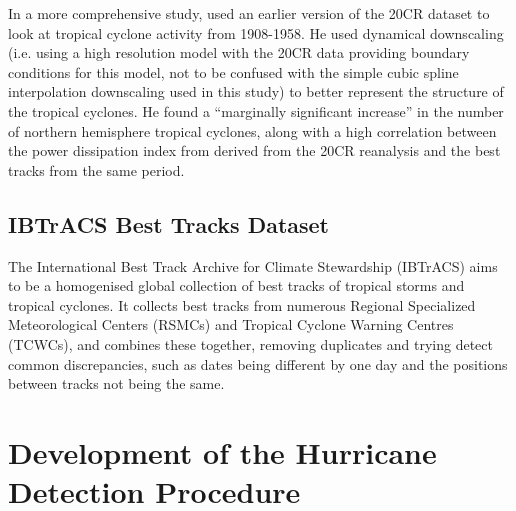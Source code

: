 \documentclass[pdftex,12pt,a4paper]{report}
\begin{document}
In a more comprehensive study, \textcite{emanuel2010} used an earlier version of the 20CR dataset to
look at tropical cyclone activity from 1908-1958. He used dynamical downscaling (i.e. using a
high resolution model with the 20CR data providing boundary conditions for this model, not to be
confused with the simple cubic spline interpolation downscaling used in this study) to better
represent the structure of the tropical cyclones. He found a ``marginally significant increase'' in
the number of northern hemisphere tropical cyclones, along with a high correlation between the power
dissipation index from derived from the 20CR reanalysis and the best tracks from the same period.


\section{IBTrACS Best Tracks Dataset}
\label{sec:ibtracs}
The International Best Track Archive for Climate Stewardship (IBTrACS)
\parencite{knappInternational2010} aims to be a homogenised global collection of best tracks of
tropical storms and tropical cyclones. It collects best tracks from numerous Regional Specialized
Meteorological Centers (RSMCs) and Tropical Cyclone Warning Centres (TCWCs), and combines these
together, removing duplicates and trying detect common discrepancies, such as dates being different
by one day and the positions between tracks not being the same. 


\chapter{Development of the Hurricane Detection Procedure}
\label{chap:development}

\end{document}
